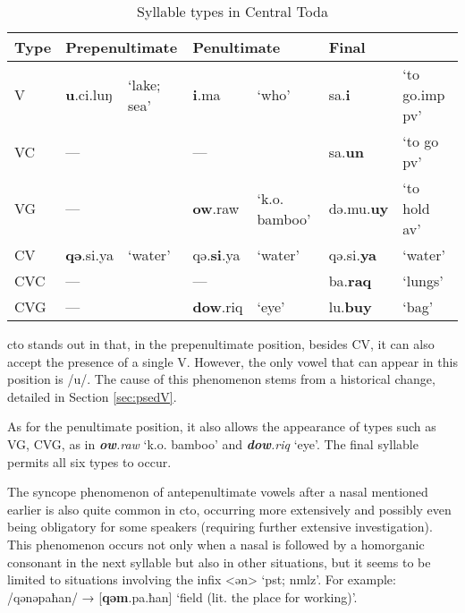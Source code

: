 \begin{table}[!htbp]
\centering
\caption{Syllable types in Central Toda}
\label{tab:sy_ty_cto}
\begin{tabular}{lllllll}
\hline
Type & \multicolumn{2}{l}{Prepenultimate} & \multicolumn{2}{l}{Penultimate} & \multicolumn{2}{l}{Final}                \\ \hline
V             & \textbf{u}.ci.luŋ & `lake; sea'    & \textbf{i}.ma            & `who'         & sa.\textbf{i}        & `to go.\acs{imp} \acs{pv}' \\
VC            & ---              &                 & ---             &               & sa.\textbf{un}       & `to go \acs{pv}'           \\
VG            & ---              &                 & \textbf{ow}.raw   & `k.o. bamboo' & də.mu.\textbf{uy} &  `to hold \acs{av}'        \\
CV            & \textbf{qə}.si.ya         & `water'         & qə.\textbf{si}.ya        & `water'       & qə.si.\textbf{ya}    & `water'                    \\
CVC           & ---              &                 & ---             &               & ba.\textbf{raq}      & `lungs'                    \\
CVG           & ---              &                 & \textbf{dow}.riq     & `eye'    & lu.\textbf{buy}      & `bag'                     \\ \hline
\end{tabular}
\end{table}

\acl{cto} stands out in that, in the prepenultimate position, besides CV, it can also accept the presence of a single V. However, the only vowel that can appear in this position is /u/. The cause of this phenomenon stems from a historical change, detailed in Section \ref{sec:psedV}.

As for the penultimate position, it also allows the appearance of types such as VG, CVG, as in \textit{\textbf{ow}.raw} `k.o. bamboo' and \textit{\textbf{dow}.riq} `eye'. The final syllable permits all six types to occur.

The syncope phenomenon of antepenultimate vowels after a nasal mentioned earlier is also quite common in \acl{cto}, occurring more extensively and possibly even being obligatory for some speakers (requiring further extensive investigation). This phenomenon occurs not only when a nasal is followed by a homorganic consonant in the next syllable but also in other situations, but it seems to be limited to situations involving the infix <ən> `\acs{pst}; \acs{nmlz}'. For example: /qənəpaħan/ → [\textbf{qəm}.pa.ħan] `field (lit. the place for working)'. 

